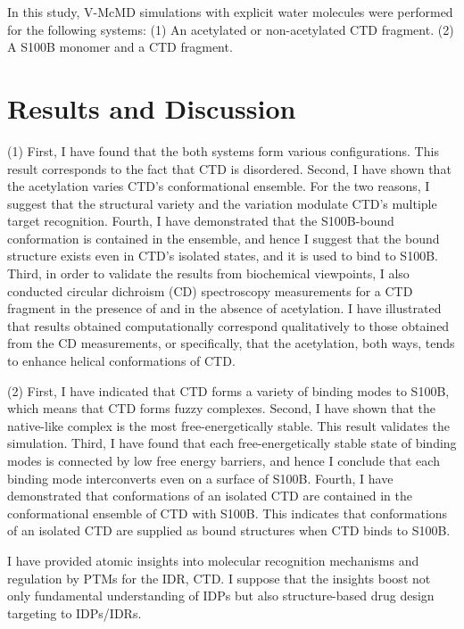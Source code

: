 	In this study, V-McMD simulations with explicit water molecules were performed for the following systems: (1) An acetylated or non-acetylated CTD fragment. (2) A S100B monomer and a CTD fragment.

\section*{Results and Discussion}
(1) First, I have found that the both systems form various configurations. This result corresponds to the fact that CTD is disordered. 
Second, I have shown that the acetylation varies CTD’s conformational ensemble. 
For the two reasons, I suggest that the structural variety and the variation modulate CTD’s multiple target recognition. 
Fourth, I have demonstrated that the S100B-bound conformation is contained in the ensemble, and hence I suggest that the bound structure exists even in CTD’s isolated states, and it is used to bind to S100B.  Third, in order to validate the results from biochemical viewpoints, I also conducted circular dichroism (CD) spectroscopy measurements for a CTD fragment in the presence of and in the absence of acetylation. I have illustrated that results obtained computationally correspond qualitatively to those obtained from the CD measurements, or specifically, that the acetylation, both ways, tends to enhance helical conformations of CTD.
 
(2) First, I have indicated that CTD forms a variety of binding modes to S100B, which means that CTD forms fuzzy complexes. 
Second, I have shown that the native-like complex is the most free-energetically stable. This result validates the simulation. 
Third, I have found that each free-energetically stable state of binding modes is connected by low free energy barriers, and hence I conclude that each binding mode interconverts even on a surface of S100B. 
Fourth, I have demonstrated that conformations of an isolated CTD are contained in the conformational ensemble of CTD with S100B. 
This indicates that conformations of an isolated CTD are supplied as bound structures when CTD binds to S100B.

I have provided atomic insights into molecular recognition mechanisms and regulation by PTMs for the IDR, CTD. I suppose that the insights boost not only fundamental understanding of IDPs but also structure-based drug design targeting to IDPs/IDRs.
